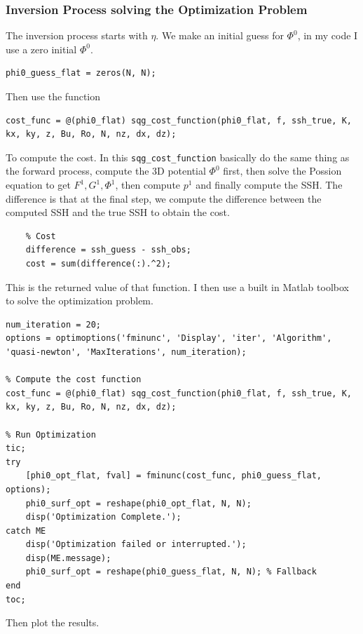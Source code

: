 \documentclass[../SQG_notes.tex]{subfiles}
\begin{document}
\subsubsection{Inversion Process solving the Optimization Problem}
The inversion process starts with $\eta$. We make an initial guess for $\Phi^0$, in my code I use a zero initial $\Phi^0$. 
\begin{lstlisting}
phi0_guess_flat = zeros(N, N);
\end{lstlisting}
Then use the function 
\begin{lstlisting}
cost_func = @(phi0_flat) sqg_cost_function(phi0_flat, f, ssh_true, K, kx, ky, z, Bu, Ro, N, nz, dx, dz);
\end{lstlisting}
To compute the cost. In this \texttt{sqg\_cost\_function} basically do the same thing as the forward process, compute the 3D potential $\Phi^0$ first, then solve the Possion equation to get $F^1, G^1, \Phi^1$, then compute $p^1$ and finally compute the SSH. The difference is that at the final step, we compute the difference between the computed SSH and the true SSH to obtain the cost. 
\begin{lstlisting}
    % Cost
    difference = ssh_guess - ssh_obs;
    cost = sum(difference(:).^2);
\end{lstlisting}
This is the returned value of that function. I then use a built in Matlab toolbox to solve the optimization problem. 
\begin{lstlisting}
num_iteration = 20;
options = optimoptions('fminunc', 'Display', 'iter', 'Algorithm', 'quasi-newton', 'MaxIterations', num_iteration);

% Compute the cost function
cost_func = @(phi0_flat) sqg_cost_function(phi0_flat, f, ssh_true, K, kx, ky, z, Bu, Ro, N, nz, dx, dz);

% Run Optimization
tic;
try
    [phi0_opt_flat, fval] = fminunc(cost_func, phi0_guess_flat, options);
    phi0_surf_opt = reshape(phi0_opt_flat, N, N);
    disp('Optimization Complete.');
catch ME
    disp('Optimization failed or interrupted.');
    disp(ME.message);
    phi0_surf_opt = reshape(phi0_guess_flat, N, N); % Fallback
end
toc;
\end{lstlisting}
Then plot the results. 
\end{document}
